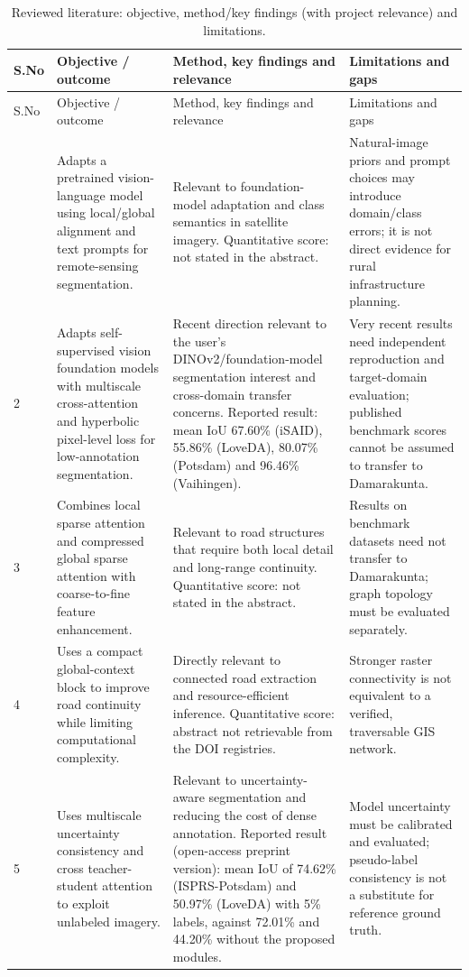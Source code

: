 \begin{landscape}
\footnotesize
\begin{longtable}{@{}L{0.6cm}L{7.5cm}L{8.0cm}L{7.5cm}@{}}
\caption{Reviewed literature: objective, method/key findings (with project relevance) and limitations.}\label{tab:lit2}\\
\toprule S.No & Objective / outcome & Method, key findings and relevance & Limitations and gaps\\\midrule\endfirsthead
\toprule S.No & Objective / outcome & Method, key findings and relevance & Limitations and gaps\\\midrule\endhead
\bottomrule{} & Adapts a pretrained vision-language model using local/global alignment and text prompts for remote-sensing segmentation. & Relevant to foundation-model adaptation and class semantics in satellite imagery. Quantitative score: not stated in the abstract. & Natural-image priors and prompt choices may introduce domain/class errors; it is not direct evidence for rural infrastructure planning.  \\
2 & Adapts self-supervised vision foundation models with multiscale cross-attention and hyperbolic pixel-level loss for low-annotation segmentation. & Recent direction relevant to the user's DINOv2/foundation-model segmentation interest and cross-domain transfer concerns. Reported result: mean IoU 67.60\% (iSAID), 55.86\% (LoveDA), 80.07\% (Potsdam) and 96.46\% (Vaihingen). & Very recent results need independent reproduction and target-domain evaluation; published benchmark scores cannot be assumed to transfer to Damarakunta.  \\
3 & Combines local sparse attention and compressed global sparse attention with coarse-to-fine feature enhancement. & Relevant to road structures that require both local detail and long-range continuity. Quantitative score: not stated in the abstract. & Results on benchmark datasets need not transfer to Damarakunta; graph topology must be evaluated separately.  \\
4 & Uses a compact global-context block to improve road continuity while limiting computational complexity. & Directly relevant to connected road extraction and resource-efficient inference. Quantitative score: abstract not retrievable from the DOI registries. & Stronger raster connectivity is not equivalent to a verified, traversable GIS network.  \\
5 & Uses multiscale uncertainty consistency and cross teacher-student attention to exploit unlabeled imagery. & Relevant to uncertainty-aware segmentation and reducing the cost of dense annotation. Reported result (open-access preprint version): mean IoU of 74.62\% (ISPRS-Potsdam) and 50.97\% (LoveDA) with 5\% labels, against 72.01\% and 44.20\% without the proposed modules. & Model uncertainty must be calibrated and evaluated; pseudo-label consistency is not a substitute for reference ground truth.  \\

\end{longtable}
\end{landscape}
